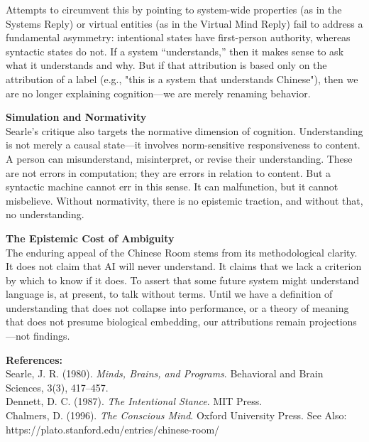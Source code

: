 \begin{technical}
Attempts to circumvent this by pointing to system-wide properties (as in the Systems Reply) or virtual entities (as in the Virtual Mind Reply) fail to address a fundamental asymmetry: intentional states have first-person authority, whereas syntactic states do not. If a system “understands,” then it makes sense to ask what it understands and why. But if that attribution is based only on the attribution of a label (e.g., "this is a system that understands Chinese"), then we are no longer explaining cognition—we are merely renaming behavior.

\noindent\textbf{Simulation and Normativity}\\[0.5em]
Searle’s critique also targets the normative dimension of cognition. Understanding is not merely a causal state—it involves norm-sensitive responsiveness to content. A person can misunderstand, misinterpret, or revise their understanding. These are not errors in computation; they are errors in relation to content. But a syntactic machine cannot err in this sense. It can malfunction, but it cannot misbelieve. Without normativity, there is no epistemic traction, and without that, no understanding.

\noindent\textbf{The Epistemic Cost of Ambiguity}\\[0.5em]
The enduring appeal of the Chinese Room stems from its methodological clarity. It does not claim that AI will never understand. It claims that we lack a criterion by which to know if it does. To assert that some future system might understand language is, at present, to talk without terms. Until we have a definition of understanding that does not collapse into performance, or a theory of meaning that does not presume biological embedding, our attributions remain projections—not findings.

\vspace{0.5em}
\noindent\textbf{References:}\\
Searle, J. R. (1980). \textit{Minds, Brains, and Programs}. Behavioral and Brain Sciences, 3(3), 417–457.\\
Dennett, D. C. (1987). \textit{The Intentional Stance}. MIT Press.\\
Chalmers, D. (1996). \textit{The Conscious Mind}. Oxford University Press.
See Also: https://plato.stanford.edu/entries/chinese-room/
\end{technical}
